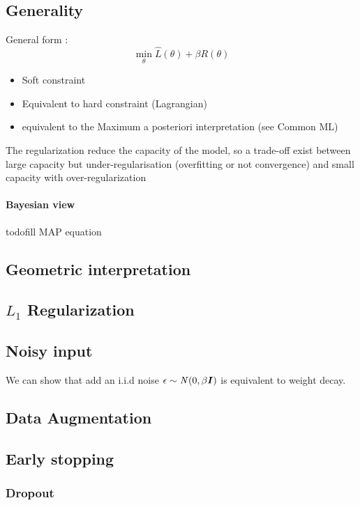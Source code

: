 	\subsection{Generality}
		General form : 
		\[
			\min_\theta \hat L(\theta) + \beta R(\theta)
		\]
		\begin{itemize}
			\item Soft constraint
			\item Equivalent to hard constraint (Lagrangian)
			\item equivalent to the Maximum a posteriori interpretation (see Common ML)
		\end{itemize}

		The regularization reduce the capacity of the model, so a trade-off exist between large capacity but under-regularisation (overfitting or not convergence) and small capacity with over-regularization

		\paragraph*{Bayesian view}
			todo{fill MAP equation}

	\subsection{Geometric interpretation}

	\subsection{$L_1$ Regularization}

	\subsection{Noisy input}
		We can show that add an i.i.d noise $\epsilon \sim \mathit{N}(0, \beta {\boldsymbol{{I}}})$ is equivalent to weight decay.
	\subsection{Data Augmentation}

	\subsection{Early stopping}

	\subsubsection*{Dropout}

